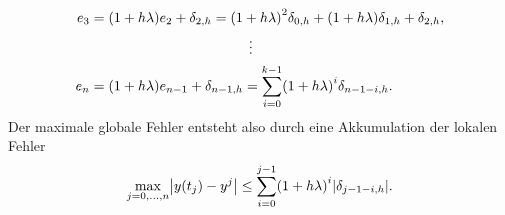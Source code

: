 \documentclass{exercise}
\begin{document}
\begin{enumerate}
\begin{align*}
			e_3 &= \parentheses*{1 + h\lambda}e_2 + \delta_{2, h} = \parentheses*{1 + h\lambda}^2 \delta_{0, h} + \parentheses*{1 + h\lambda}\delta_{1, h} + \delta_{2, h},\\
			&\hspace{4cm}\vdots\\
			e_n &= \parentheses*{1 + h\lambda}e_{n - 1} + \delta_{n - 1, h} = \sum_{i = 0}^{k - 1}\parentheses*{1 + h\lambda}^i \delta_{n - 1 - i, h}.
		\end{align*}
		Der maximale globale Fehler entsteht also durch eine Akkumulation der lokalen Fehler
		\[
			\max_{j = 0, \ldots, n}\absolute*{y\parentheses*{t_j} - y^j} \le \sum_{i = 0}^{j - 1}\parentheses*{1 + h\lambda}^i \absolute*{\delta_{j - 1 - i, h}}.
		\]
	\end{enumerate}
\end{document}
